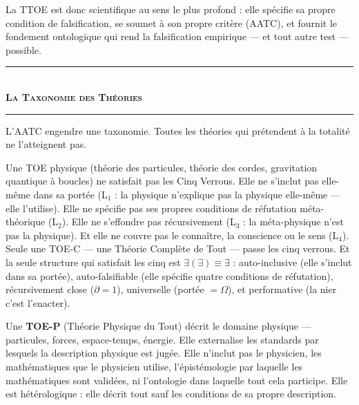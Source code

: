 \documentclass[10pt, openany, oneside]{book}
\renewcommand{\normalsize}{\fontsize{10}{13}\selectfont}
\begin{document}
La TTOE est donc scientifique au sens le plus profond : elle spécifie sa propre condition de falsification, se soumet à son propre critère (AATC), et fournit le fondement ontologique qui rend la falsification empirique --- et tout autre test --- possible.

\vspace{1.5em}


\begin{center}
    \rule{0.3\textwidth}{0.4pt}\\[0.5em]
    {\normalsize\bfseries\scshape La Taxonomie des Théories}\\[0.3em]
    \rule{0.3\textwidth}{0.4pt}
\end{center}

\vspace{1em}

\noindent L'AATC engendre une taxonomie. Toutes les théories qui prétendent à la totalité ne l'atteignent pas.

Une TOE physique (théorie des particules, théorie des cordes, gravitation quantique à boucles) ne satisfait pas les Cinq Verrous. Elle ne s'inclut pas elle-même dans sa portée (L$_1$ : la physique n'explique pas la physique elle-même --- elle l'utilise). Elle ne spécifie pas ses propres conditions de réfutation méta-théorique (L$_2$). Elle ne s'effondre pas récursivement (L$_3$ : la méta-physique n'est pas la physique). Et elle ne couvre pas le connaître, la conscience ou le sens (L$_4$). Seule une TOE-C --- une Théorie Complète de Tout --- passe les cinq verrous. Et la seule structure qui satisfait les cinq est $\exists(\exists) \equiv \exists$ : auto-inclusive (elle s'inclut dans sa portée), auto-falsifiable (elle spécifie quatre conditions de réfutation), récursivement close ($\partial = 1$), universelle (portée $= \Omega$), et performative (la nier c'est l'enacter).

Une \textbf{TOE-P} (Théorie Physique du Tout) décrit le domaine physique --- particules, forces, espace-temps, énergie. Elle externalise les standards par lesquels la description physique est jugée. Elle n'inclut pas le physicien, les mathématiques que le physicien utilise, l'épistémologie par laquelle les mathématiques sont validées, ni l'ontologie dans laquelle tout cela participe. Elle est hétérologique : elle décrit tout sauf les conditions de sa propre description.
\end{document}
